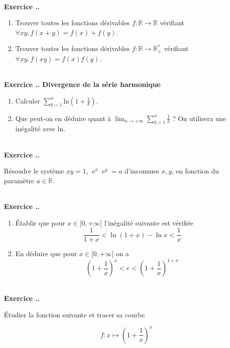 \documentclass{article}
\newcommand{\ex}{\operatorname{e}}
\newcommand{\mb}[1]{\mathbb{#1}}
\newcounter{exo}
\newcommand{\exercice}[1][\null]{\textbf{\\ \large Exercice \thesection.\theexo. \normalsize #1} \addtocounter{exo}{1}}
\begin{document}
\exercice

\begin{enumerate}

\item Trouver toutes les fonctions dérivables $f :\mb{R} \rightarrow \mb{R}$ vérifiant $\forall xy, f(x+y) = f(x)+ f(y)$.

\item Trouver toutes les fonctions dérivables $f :\mb{R} \rightarrow \mb{R}^*_+$ vérifiant $\forall xy, f(xy) = f(x)f(y)$.
\end{enumerate}

\exercice[Divergence de la série harmonique]

\begin{enumerate}

\item Calculer $\displaystyle \sum_{k=1}^n  \text{ln}(1+ \frac{1}{k})$.

\item Que peut-on en déduire quant à $\displaystyle \lim_{n \to + \infty} \sum_{k=1}^n \frac{1}{k}$ ? On utilisera une inégalité avec $\text{ln}$.
\end{enumerate}

\exercice

Résoudre le système $xy = 1$, ${\ex}^x {\ex}^y =a$ d'inconnues $x,y$, en fonction du paramètre $a \in \mb{R}$.


\exercice 

\begin{enumerate}
    \item Établir que pour $x \in ]0, +\infty[$ l'inégalité suivante
        est vérifiée
        \begin{equation*}
            \frac{1}{1+x} < \ln (1 + x) - \ln x < \frac{1}{x}
        \end{equation*}

    \item En déduire que pour $x \in ]0,+\infty[$ on a
        \begin{equation*}
            \left(1 + \frac{1}{x}\right)^x < e < \left(1 + \frac{1}{x}\right)^{1 + x}
        \end{equation*}
\end{enumerate}

\exercice

Étudier la fonction suivante et tracer sa courbe 

\begin{equation*}
    f : x \mapsto \left(1 + \frac{1}{x}\right)^x
\end{equation*}
\end{document}
